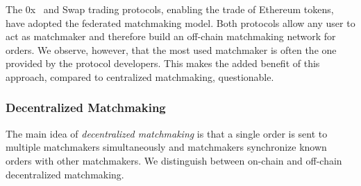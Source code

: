 


The 0x~\cite{0x} and Swap trading protocols, enabling the trade of Ethereum tokens, have adopted the federated matchmaking model.
Both protocols allow any user to act as matchmaker and therefore build an off-chain matchmaking network for orders.
We observe, however, that the most used matchmaker is often the one provided by the protocol developers.
This makes the added benefit of this approach, compared to centralized matchmaking, questionable.

\subsubsection{Decentralized Matchmaking}
The main idea of \emph{decentralized matchmaking} is that a single order is sent to multiple matchmakers simultaneously and matchmakers synchronize known orders with other matchmakers.
We distinguish between on-chain and off-chain decentralized matchmaking.

